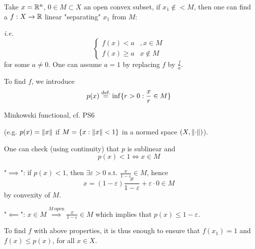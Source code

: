 \documentclass{article}
\begin{document}
\begin{remark}\nl
    Take $x=\mathbb{R}^n$, $0 \in M \subset X$ an open convex subset, if $x_1 \notin <M$, then one can find a $f: X \to \mathbb{R}$ linear "separating" $x_1$ from $M$:

    \textit{i.e.} $$
    \begin{cases}
        f(x) < a & , x\in M \\
        f(x) \geq a & x \notin M
    \end{cases}
    $$
    for some $a\neq 0$. One can assume $a=1$ by replacing $f$ by $\frac{f}{a}$.  

    To find $f$, we introduce  
    $$
    p(x) \stackrel{\text{def.}}{=} \inf \{r > 0: \frac{x}{r} \in M\}
    $$
    \begin{unexaminable}
        Minkowski functional, cf. PS6
    \end{unexaminable}
    (e.g. $p(x)=\left\|{x}\right\|$ if $M=\{x: \left\|{x}\right\|<1\}$ in a normed space $(X, \left\|{\cdot}\right\|)$).

    One can check (using continuity) that $p$ is sublinear and  
    $$
    p(x) < 1 \iff x \in M
    $$
    
    "$\implies$": if $p(x)<1$, then $\exists \varepsilon >0$ s.t. $\frac{x}{1-\varepsilon} \in M$, hence  
    $$
    x = (1-\varepsilon) \frac{x}{1-\varepsilon} + \varepsilon \cdot 0 \in M
    $$
    by convexity of $M$.  

    "$\impliedby$": $x \in  M \overset{M \ \text{open}}{\implies} \frac{x}{1-\varepsilon} \in M$ which implies that $p(x) \leq 1-\varepsilon$.  

    To find $f$ with above properties, it is thus enough to ensure that $f(x_1)=1$ and $f(x) \leq p(x)$, for all $x \in X$.
\end{remark}
\end{document}

